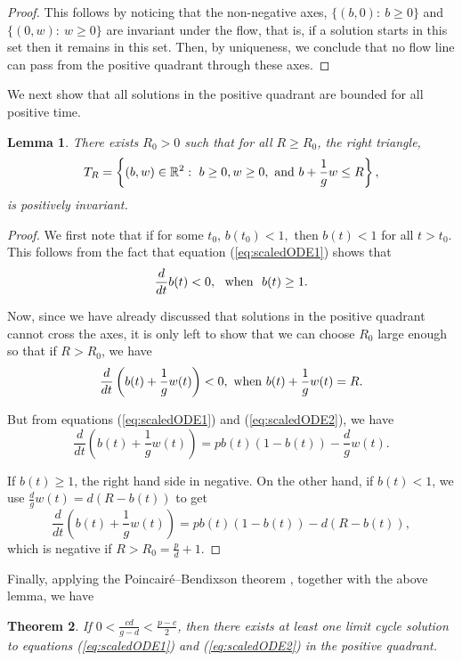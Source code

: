 \documentclass[review,authoryear]{elsarticle}
\newtheorem{theorem}{Theorem}[section]
\newtheorem{lemma}[theorem]{Lemma}
\begin{document}
\begin{proof}
  This follows by noticing that the non-negative axes, $\{(b,0):\  b \ge 0\}$ and $\{(0,w):\  w\ge 0\}$ are invariant under the flow, that is, if a solution starts in this set then it remains in this set. Then, by uniqueness, we conclude that no flow line can pass from the positive quadrant through these axes.
\end{proof}

We next show that all solutions in the positive quadrant are bounded for all positive time.  

\begin{lemma}
There exists $R_{0}>0$  such that for all $R\geq R_{0}$, the right
triangle, 
$$T_{R}=\left\{ \left(b,w\right) \in \mathbb R^{2}:\  b\ge 0, w\ge 0, \ {\rm and}\  b+\frac{1}{g}w\le R\right\}, $$  
is positively invariant.
\end{lemma}

\begin{proof}
  We first note that if for some $t_0$, $b(t_0)< 1,$ then $b(t) < 1$ for all $t>t_0$.  This follows from the fact that equation (\ref{eq:scaledODE1}) shows that 
  $$\frac{d}{dt}b(t) < 0,\  \  {\rm when}\ \ b(t)\ge 1.$$
  
  Now, since we have already discussed that solutions in the positive quadrant cannot cross the axes, it is only left to show that we can choose $R_0$ large enough so that if $R>R_0$, we have
  $$\frac{d}{dt}\left(b(t)+\frac{1}{g}w(t)\right) <0,\  {\rm when}\  b(t)+\frac{1}{g}w(t) =R.$$
  
  But from equations (\ref{eq:scaledODE1}) and (\ref{eq:scaledODE2}), we have
  $$\frac{d}{dt}\left(b(t)+\frac{1}{g}w(t)\right)  = p b(t)\left( 1-b(t)\right) -\frac{d}{g}
w\left( t\right) . $$

If $b(t) \ge 1$, the right hand side in negative.  On the other hand, if $b(t) < 1$, we use $\frac{d}{g}w(t) = d(R-b(t))$ to get
$$\frac{d}{dt}(b(t)+\frac{1}{g}w(t)) =p b(t)\left(
1-b(t)\right) -d\left( R-b(t)\right),$$
which is negative if $R>R_0= \frac{p}{d} +1.$
\end{proof}

Finally, applying the Poincair\'{e}--Bendixson theorem \citep{nonlinearChaos}, together with the above lemma, we have

\begin{theorem}
  If $0 < \frac{cd}{g-d} < \frac{p -c}{2}$, then there exists at least one  limit cycle solution to equations (\ref{eq:scaledODE1}) and (\ref{eq:scaledODE2}) in the positive quadrant.
\end{theorem}
\end{document}
